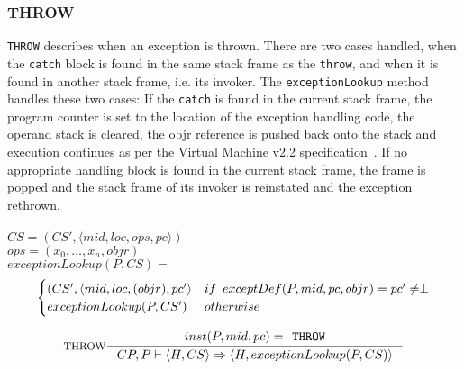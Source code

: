 \subsubsection{THROW}
\texttt{THROW} describes when an exception is thrown. There are two cases handled, when the \texttt{catch} block is found in the same stack frame as the \texttt{throw}, and when it is found in another stack frame, i.e. its invoker. The \texttt{exceptionLookup} method handles these two cases: If the \texttt{catch} is found in the current stack frame, the program counter is set to the location of the exception handling code, the operand stack is cleared, the objr reference is pushed back onto the stack and execution continues as per the \jc Virtual Machine v2.2 specification~\cite[JcvmSpec p. 151]{jcvm}. If no appropriate handling block is found in the current stack frame, the frame is popped and the stack frame of its invoker is reinstated and the exception rethrown.\\\\
$CS = (CS', \langle mid, loc, ops, pc \rangle)$ \\ 
$ops = (x_0, \ldots, x_n, objr)$\vspace{5px} \\
$exceptionLookup(P, CS) = $ \vspace{-10px} \\
\[
\begin{cases}
  (CS', \langle mid, loc, (objr), pc' \rangle  & if \hspace{5px} exceptDef(P, mid, pc, objr) = pc' \neq \perp\\
  exceptionLookup(P, CS') & otherwise
\end{cases}
\]

$$\inference[THROW]{
inst(P,mid,pc) = \texttt{THROW} }
{CP, P \vdash \langle H, CS \rangle \Rightarrow \langle H, exceptionLookup(P,CS)\rangle}$$